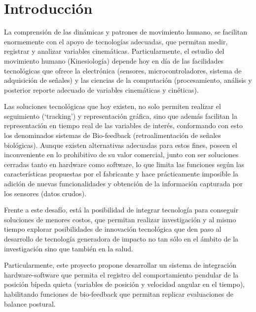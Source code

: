 \documentclass[12pt,a4paper]{article}
\begin{document}
\setcounter{page}{1}

\let\stdsection\section
\renewcommand\section{\newpage\stdsection}

\section{Introducción}
La comprensión de las dinámicas y patrones de movimiento humano, se facilitan enormemente con el apoyo de tecnologías adecuadas, que permitan medir, registrar y analizar variables cinemáticas. Particularmente, el estudio del movimiento humano (Kinesiología) depende hoy en día de las facilidades tecnológicas que ofrece la electrónica (sensores, microcontroladores, sistema de adquisición de señales) y las ciencias de la computación (procesamiento, análisis y posterior reporte adecuado de  variables cinemáticas y cinéticas).  

Las soluciones tecnológicas que hoy existen, no solo permiten realizar el seguimiento (‘tracking’) y representación gráfica, sino que además facilitan la representación en tiempo real de las variables de interés, conformando con esto los denominados sistemas de Bio-feedback (retroalimentación de señales biológicas). Aunque existen alternativas adecuadas para estos fines, poseen el inconveniente en lo prohibitivo de su valor comercial, junto con ser soluciones cerradas tanto en hardware como software, lo que limita las funciones según las características propuestas por el fabricante y hace prácticamente imposible la adición de nuevas funcionalidades y obtención de la información capturada por los sensores (datos crudos).

Frente a este desafío, está la posibilidad de integrar tecnología para conseguir soluciones de menores costos, que permitan realizar investigación y al mismo tiempo explorar posibilidades de innovación tecnológica que den paso al desarrollo de tecnología generadora de impacto no tan sólo en el ámbito de la investigación sino que también en la salud.

Particularmente, este proyecto propone desarrollar un sistema de integración hardware-software que permita el registro del comportamiento pendular de la posición bípeda quieta (variables de posición y velocidad angular en el tiempo), habilitando funciones de bio-feedback que permitan replicar evaluaciones de balance postural.
\end{document}
